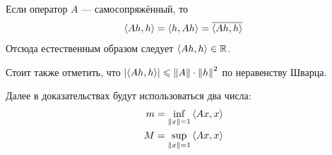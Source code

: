 \documentclass[12pt]{article}
\begin{document}
		\begin{state}
			Если оператор $A$ --- самосопряжённый, то
			$$\left\langle Ah, h \right\rangle = \left\langle h, Ah \right\rangle = \overline{\left\langle Ah, h \right\rangle}$$
			Отсюда естественным образом следует $\left\langle Ah, h \right\rangle \in \mathbb{R}$.
		\end{state}
	
		Стоит также отметить, что $\left| \left\langle Ah, h \right\rangle \right| \leqslant \left\| A \right\| \cdot \left\| h \right\|^2$ по неравенству Шварца.
	
		Далее в доказательствах будут использоваться два числа:
		\begin{equation} \label{eq:mAndM}
			\begin{aligned}
				m &= \underset{\left\| x \right\| = 1}{\inf} \left\langle Ax, x \right\rangle \\
				M &= \underset{\left\| x \right\| = 1}{\sup} \left\langle Ax, x \right\rangle
			\end{aligned}
		\end{equation}
	
\end{document}
